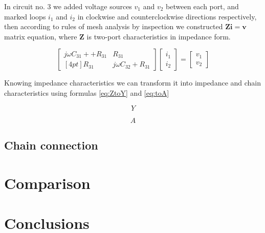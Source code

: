 \documentclass[notitlepage, a4paper, 11pt]{article}
\begin{document}
	In circuit no. 3 we added voltage sources $v_1$ and $v_2$ between each port, and marked loops $i_1$ and $i_2$ in clockwise and counterclockwise directions respectively, then according to rules of mesh analysis by inspection we constructed $\mathbf{Zi=v}$ matrix equation, where $\mathbf{Z}$ is two-port characteristics in impedance form.
	
	\begin{equation}
		\begin{bmatrix}
			j\omega C_{31} + +R_{31} & R_{31} \\ [4pt]
			R_{31} & j\omega C_{32} + R_{31}
		\end{bmatrix}
		\begin{bmatrix}
			i_1 \\
			i_2
		\end{bmatrix}
		=
		\begin{bmatrix}
			v_1 \\ 
			v_2
		\end{bmatrix}		
	\end{equation}
	
	Knowing impedance characteristics we can transform it into impedance and chain characteristics using formulas \eqref{eq:ZtoY} and \eqref{eq:toA}

	\begin{equation}\label{eq:C3Y}
		Y
	\end{equation}
	
	\begin{equation}\label{eq:C3A}
		A
	\end{equation}
	
	\subsection{Chain connection}
	
	\section{Comparison}
	\section{Conclusions}
	
	
	
\end{document}
